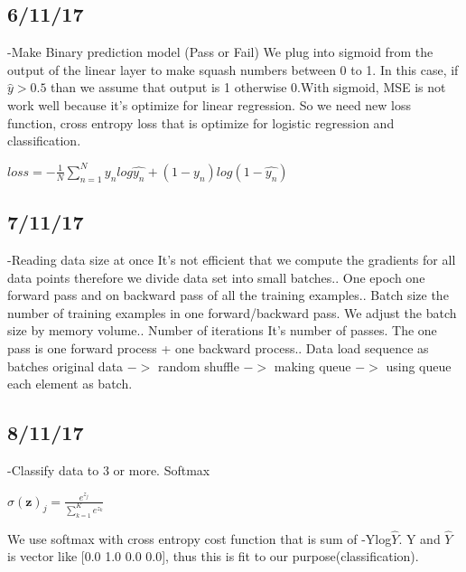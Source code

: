 \documentclass{article}
\begin{document}
\begin{CJK}{UTF8}{}
\subsection{6/11/17}
-Make Binary prediction model (Pass or Fail)\newline
We plug into sigmoid from the output of the linear layer to make squash numbers between 0 to 1. In this case, if $ \hat{y} > 0.5$ than we assume that output is 1 otherwise 0.\newline With sigmoid, MSE is not work well because it's optimize for linear regression. So we need new loss function, cross entropy loss that is optimize for logistic regression and classification.\newline
\begin{center}$loss = -\frac1N{\textstyle\sum_{n=1}^N}{y}_{n} log\hat{y_n} + (1-{y_n})log(1-\hat{y_n})$\end{center}\newline
 
 
\subsection{7/11/17}
-Reading data size at once\newline
It's not efficient that we compute the gradients for all data points therefore we divide data set into small batches.. One epoch\newline
one forward pass and on backward pass of all the training examples.. Batch size\newline
the number of training examples in one forward/backward pass. We adjust the batch size by memory volume.. Number of iterations\newline
It's number of passes. The one pass is one forward process + one backward process.. Data load sequence as batches \newline
original data $->$ random shuffle $->$ making queue $->$ using queue each element as batch.\newline

\subsection{8/11/17}
-Classify data to 3 or more. Softmax\newline
\begin{center}
            ${\sigma(\boldsymbol{z})}_{j} = \frac{{e}^{{z}_{j}}}{\sum_{k=1}^{K}{e}^{{z}_{k}}}$  
\end{center}
We use softmax with cross entropy cost function that is sum of -Ylog$\hat{Y}$. Y and $\hat{Y}$ is vector like [0.0 1.0 0.0 0.0], thus this is fit to our purpose(classification).\newline


\end{CJK}
\end{document}
